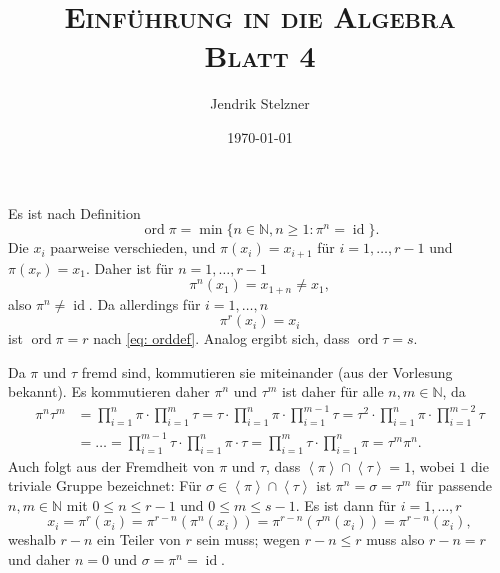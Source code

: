 \documentclass[a4paper,10pt]{article}
\title{\textsc{Einführung in die Algebra \\ \Large Blatt 4}}
\author{Jendrik Stelzner}
\date{\today}
\theoremstyle{definition}
\newcommand{\N}{\mathbb{N}}
\newcommand{\id}{\operatorname{id}}
\newcommand{\ord}{\operatorname{ord}}
\newcommand{\gen}[1]{\left\langle#1\right\rangle}
\begin{document}
\maketitle





\section{}





\section{}


\subsection{}\label{ssc: zykelordnung}
Es ist nach Definition
\begin{equation}\label{eq: orddef}
 \ord \pi = \min\{n \in \N, n \geq 1 : \pi^n = \id \}.
\end{equation}
Die $x_i$ paarweise verschieden, und $\pi(x_i) = x_{i+1}$ für $i=1,\ldots,r-1$ und $\pi(x_r) = x_1$. Daher ist für $n=1,\ldots,r-1$
\[
 \pi^n(x_1) = x_{1+n} \neq x_1,
\]
also $\pi^n \neq \id$. Da allerdings für $i=1,\ldots,n$
\[
 \pi^r(x_i) = x_i 
\]
ist $\ord \pi = r$ nach \eqref{eq: orddef}. Analog ergibt sich, dass $\ord \tau = s$.

Da $\pi$ und $\tau$ fremd sind, kommutieren sie miteinander (aus der Vorlesung bekannt). Es kommutieren daher $\pi^n$ und $\tau^m$ ist daher für alle $n,m \in \N$, da
\begin{align*}
 \pi^n \tau^m
 &= \prod_{i=1}^n \pi \cdot \prod_{i=1}^m \tau
 = \tau \cdot \prod_{i=1}^n \pi \cdot \prod_{i=1}^{m-1} \tau
 = \tau^2 \cdot \prod_{i=1}^n \pi \cdot \prod_{i=1}^{m-2} \tau \\
 &= \ldots
 = \prod_{i=1}^{m-1} \tau \cdot \prod_{i=1}^n \pi \cdot \tau
 = \prod_{i=1}^m \tau \cdot \prod_{i=1}^n \pi
 = \tau^m \pi^n.
\end{align*}
Auch folgt aus der Fremdheit von $\pi$ und $\tau$, dass $\gen{\pi} \cap \gen{\tau} = 1$, wobei $1$ die triviale Gruppe bezeichnet: Für $\sigma \in \gen{\pi} \cap \gen{\tau}$ ist $\pi^n = \sigma = \tau^m$ für passende $n,m \in \N$ mit $0 \leq n \leq r-1$ und $0 \leq m \leq s-1$. Es ist dann für $i=1,\ldots,r$
\[
 x_i = \pi^{r}(x_i) = \pi^{r-n}(\pi^n(x_i)) = \pi^{r-n}(\tau^m(x_i)) = \pi^{r-n}(x_i),
\]
weshalb $r-n$ ein Teiler von $r$ sein muss; wegen $r-n \leq r$ muss also $r-n = r$ und daher $n=0$ und $\sigma = \pi^n = \id$.
\end{document}
